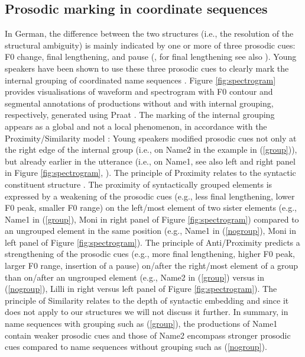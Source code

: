 \documentclass[output=paper]{langscibook}
\begin{document}
\subsection{Prosodic marking in coordinate sequences}
In German, the difference between the two structures (i.e., the resolution of the structural ambiguity) is mainly indicated by one or more of three prosodic cues: F0 change, final lengthening, and pause (\cite{peters_phonetische_2005, gollrad_prosodic_2010, kentner_new_2013,  petrone_prosodic_2017}, for final lengthening see also ).  
Young speakers have been shown to use these three prosodic cues to clearly mark the internal grouping of coordinated name sequences \citep{kentner_new_2013, petrone_prosodic_2017, huttenlauchetal2021}. 
Figure \ref{fig:spectrogram} provides visualisations of waveform and spectrogram with F0 contour and segmental annotations of productions without and with internal grouping, respectively, generated using Praat \citep{boersma_praat:_2017}.
The marking of the internal grouping appears as a global and not a local phenomenon, in accordance with the Proximity\fshyp Similarity model \citep{kentner_new_2013}: Young speakers modified prosodic cues not only at the right edge of the internal group (i.e., on Name2 in the example in (\ref{group})),  but already earlier in the utterance (i.e., on Name1, see also left and right panel in Figure \ref{fig:spectrogram}, \citealt{kentner_new_2013, huttenlauchetal2021}). The principle of Proximity relates to the syntactic constituent structure \citep{kentner_new_2013}. The proximity of syntactically grouped elements is expressed by a weakening of the prosodic cues (e.g., less final lengthening, lower F0 peak, smaller F0 range) on the left\-/most element of two sister elements (e.g., Name1 in (\ref{group}), Moni in right panel of Figure \ref{fig:spectrogram}) compared to an ungrouped element in the same position (e.g., Name1 in (\ref{nogroup}), Moni in left panel of Figure \ref{fig:spectrogram}). The principle of Anti\-/Proximity predicts a strengthening of the prosodic cues (e.g., more final lengthening, higher F0 peak, larger F0 range, insertion of a pause) on\fshyp after the right\-/most element of a group than on\fshyp after an ungrouped element (e.g., Name2 in (\ref{group}) versus in (\ref{nogroup}), Lilli in right versus left panel of Figure \ref{fig:spectrogram}). The principle of Similarity relates to the depth of syntactic embedding and since it does not apply to our structures we will not discuss it further. In summary, in name sequences with grouping such as (\ref{group}), the productions of Name1  contain weaker prosodic cues and those of Name2 encompass stronger prosodic cues compared to name sequences without grouping such as (\ref{nogroup}). 
\end{document}
